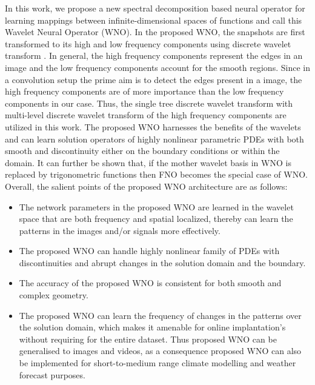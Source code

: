 \documentclass{article}
\begin{document}
In this work, we propose a new spectral decomposition based neural operator for learning mappings between infinite-dimensional spaces of functions and call this Wavelet Neural Operator (WNO). In the proposed WNO, the snapshots are first transformed to its high and low frequency components using discrete wavelet transform \cite{selesnick2005dual,ray2006dual}. In general, the high frequency components represent the edges in an image and the low frequency components account for the smooth regions. Since in a convolution setup the prime aim is to detect the edges present in a image, the high frequency components are of more importance than the low frequency components in our case. Thus, the single tree discrete wavelet transform with multi-level discrete wavelet transform of the high frequency components are utilized in this work. 
The proposed WNO harnesses the benefits of the wavelets and can learn solution operators of highly nonlinear parametric PDEs with both smooth and discontinuity either on the boundary conditions or within the domain. It can further be shown that, if the mother wavelet basis in WNO is replaced by trigonometric functions then FNO becomes the special case of WNO. Overall, the salient points of the proposed WNO architecture are as follows:
\begin{itemize}
    \item The network parameters in the proposed WNO are learned in the wavelet space that are both frequency and spatial localized, thereby can learn the patterns in the images and/or signals more effectively.
    \item The proposed WNO can handle highly nonlinear family of PDEs with discontinuities and abrupt changes in the solution domain and the boundary.
    \item The accuracy of the proposed WNO is consistent for both smooth and complex geometry.
    \item The proposed WNO can learn the frequency of changes in the patterns over the solution domain, which makes it amenable for online implantation's without requiring for the entire dataset. Thus proposed WNO can be generalised to images and videos, as a consequence proposed WNO can also be implemented for short-to-medium range climate modelling and weather forecast purposes.
\end{itemize}
\end{document}
